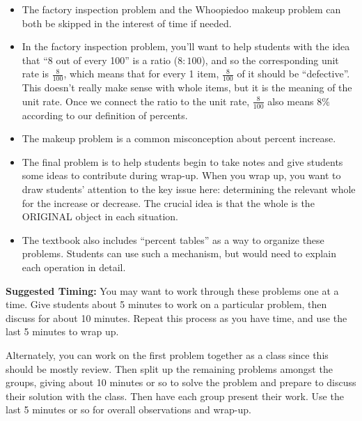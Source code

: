 \documentclass[noauthor,nooutcomes]{ximera}
\begin{document}
\begin{instructorNotes}
\begin{itemize}
	\item The factory inspection problem and the Whoopiedoo makeup problem can both be skipped in the interest of time if needed.
	\item In the factory inspection problem, you'll want to help students with the idea that ``8 out of every 100'' is a ratio ($8:100$), and so the corresponding unit rate is $\frac{8}{100}$, which means that for every 1 item, $\frac{8}{100}$ of it should be ``defective''. This doesn't really make sense with whole items, but it is the meaning of the unit rate. Once we connect the ratio to the unit rate, $\frac{8}{100}$ also means $8\%$ according to our definition of percents. 
	\item The makeup problem is a common misconception about percent increase.
	\item The final problem is to help students begin to take notes and give students some ideas to contribute during  wrap-up. When you wrap up, you want to draw students' attention to the key issue here: determining the relevant whole for the increase or decrease. The crucial idea is that the whole is the ORIGINAL object in each situation.
	\item The textbook also includes ``percent tables'' as a way to organize these problems. Students can use such a mechanism, but would need to explain each operation in detail.

	
\end{itemize}


{\bf Suggested Timing:} You may want to work through these problems one at a time. Give students about 5 minutes to work on a particular problem, then discuss for about 10 minutes. Repeat this process as you have time, and use the last 5 minutes to wrap up. 

Alternately, you can work on the first problem together as a class since this should be mostly review. Then split up the remaining problems amongst the groups, giving about 10 minutes or so to solve the problem and prepare to discuss their solution with the class. Then have each group present their work. Use the last 5 minutes or so for overall observations and wrap-up.

\end{instructorNotes}
\end{document}
